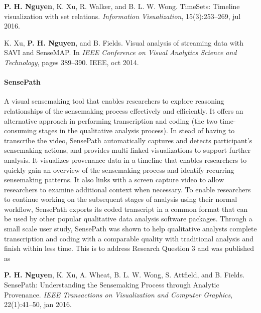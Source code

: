 \textbf{P. H. Nguyen}, K. Xu, R. Walker, and B. L. W. Wong. TimeSets: Timeline visualization with set relations. \textit{Information Visualization}, 15(3):253--269, jul 2016.

K. Xu, \textbf{P. H. Nguyen}, and B. Fields. Visual analysis of streaming data with SAVI and SenseMAP. In \textit{IEEE Conference on Visual Analytics Science and Technology}, pages 389--390. IEEE, oct 2014.

\paragraph{SensePath} A visual sensemaking tool that enables researchers to explore reasoning relationships of the sensemaking process effectively and efficiently. It offers an alternative approach in performing transcription and coding (the two time-consuming stages in the qualitative analysis process). In stead of having to transcribe the video, SensePath automatically captures and detects participant's sensemaking actions, and provides multi-linked visualizations to support further analysis. It visualizes provenance data in a timeline that enables researchers to quickly gain an overview of the sensemaking process and identify recurring sensemaking patterns. It also links with a screen capture video to allow researchers to examine  additional context when necessary. To enable researchers to continue working on the subsequent stages of analysis using their normal workflow, SensePath exports its coded transcript in a common format that can be used by other popular qualitative data analysis software packages. Through a small scale user study, SensePath was shown to help qualitative analysts complete transcription and coding with a comparable quality with traditional analysis and finish within less time. This is to address Research Question 3 and was published as

\textbf{P. H. Nguyen}, K. Xu, A. Wheat, B. L. W. Wong, S. Attfield, and B. Fields. SensePath: Understanding the Sensemaking Process through Analytic Provenance. \textit{IEEE Transactions on Visualization and Computer Graphics}, 22(1):41--50, jan 2016.


